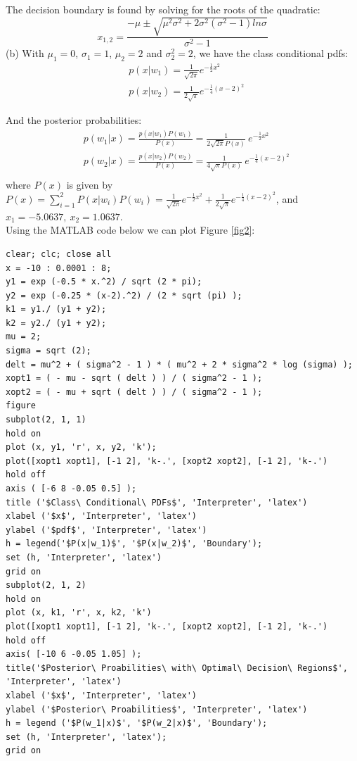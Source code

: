 \documentclass[12pt]{article}
\begin{document}
\noindent The decision boundary is found by solving for the roots of the quadratic:
\begin{equation*}
x_{1,2}=\frac{-\mu \pm \sqrt{\mu^2\sigma^2+2\sigma^2(\sigma^2-1)ln\sigma}}{\sigma^2-1}
\end{equation*}
\vfill
\clearpage
\noindent (b) With $\mu_1=0$, $\sigma_1=1$, $\mu_2=2$ and $\sigma_2^2=2$, we have the class conditional pdfs:\\
\begin{equation*}
\begin{aligned}
& p(x|w_1)=\frac{1}{\sqrt{2\pi}} e^{-\frac{1}{2} x^2} \\
& p(x|w_2)=\frac{1}{2\sqrt{\pi}} e^{-\frac{1}{4} (x-2)^2} 
\end{aligned}
\end{equation*}

\noindent And the posterior probabilities:
\begin{equation*}
\begin{aligned}
& p(w_1|x)=\frac{p(x|w_1)P(w_1)}{P(x)}=\frac{1}{2\sqrt{2\pi}P(x)}    \ e^{-\frac{1}{2} x^2}\\
& p(w_2|x)=\frac{p(x|w_2)P(w_2)}{P(x)}=\frac{1}{4\sqrt{\pi}P(x)}    \ e^{-\frac{1}{4} (x-2)^2}\\
\end{aligned}
\end{equation*}
where $P(x)$ is given by $P(x)=\sum^2_{i=1}P(x|w_i)P(w_i)=\frac{1}{\sqrt{2\pi}} e^{-\frac{1}{2} x^2} + \frac{1}{2\sqrt{\pi}} e^{-\frac{1}{4} (x-2)^2}$, and $x_1=-5.0637,\ x_2=1.0637$.\\
\noindent Using the MATLAB code below we can plot Figure \ref{fig2}:
\begin{lstlisting}
clear; clc; close all
x = -10 : 0.0001 : 8;
y1 = exp (-0.5 * x.^2) / sqrt (2 * pi);
y2 = exp (-0.25 * (x-2).^2) / (2 * sqrt (pi) );
k1 = y1./ (y1 + y2);
k2 = y2./ (y1 + y2);
mu = 2;
sigma = sqrt (2);
delt = mu^2 + ( sigma^2 - 1 ) * ( mu^2 + 2 * sigma^2 * log (sigma) );
xopt1 = ( - mu - sqrt ( delt ) ) / ( sigma^2 - 1 );
xopt2 = ( - mu + sqrt ( delt ) ) / ( sigma^2 - 1 );
figure
subplot(2, 1, 1)
hold on
plot (x, y1, 'r', x, y2, 'k');
plot([xopt1 xopt1], [-1 2], 'k-.', [xopt2 xopt2], [-1 2], 'k-.')
hold off
axis ( [-6 8 -0.05 0.5] );
title ('$Class\ Conditional\ PDFs$', 'Interpreter', 'latex')
xlabel ('$x$', 'Interpreter', 'latex')
ylabel ('$pdf$', 'Interpreter', 'latex')
h = legend('$P(x|w_1)$', '$P(x|w_2)$', 'Boundary');
set (h, 'Interpreter', 'latex')
grid on
subplot(2, 1, 2)
hold on
plot (x, k1, 'r', x, k2, 'k')
plot([xopt1 xopt1], [-1 2], 'k-.', [xopt2 xopt2], [-1 2], 'k-.')
hold off
axis( [-10 6 -0.05 1.05] );
title('$Posterior\ Proabilities\ with\ Optimal\ Decision\ Regions$', 'Interpreter', 'latex')
xlabel ('$x$', 'Interpreter', 'latex')
ylabel ('$Posterior\ Proabilities$', 'Interpreter', 'latex')
h = legend ('$P(w_1|x)$', '$P(w_2|x)$', 'Boundary');
set (h, 'Interpreter', 'latex');
grid on
\end{lstlisting}
\vfill
\clearpage
\end{document}
